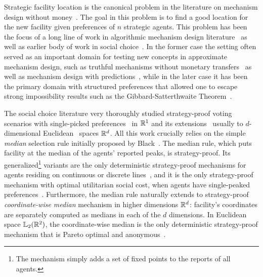 Strategic facility location is the canonical problem in the literature on mechanism design without money~\cite{procaccia2013approximate}. 
The goal in this problem is to find a good location for the new facility given preferences of $n$ strategic agents. 
This problem has been the focus of a long 
line of work in algorithmic mechanism design literature~\cite{procaccia2013approximate, FotakisT14, FotakisT16, SerafinoV16, walsh2020strategy, GkatzelisKST22}  as well as earlier body of work in social choice~\cite{moulin1980strategy,border1983straightforward,kim1984nonmanipulability,peters1993range,barbera1993generalized,ching1997strategy,peremans1997strategy,barbera1998strategy,schummer2002strategy}. In the former case the setting often served as an important domain for testing new concepts in approximate mechanism design, such as truthful mechanisms without monetary transfers~\cite{procaccia2013approximate} as well as mechanism design with predictions~\cite{GkatzelisKST22,XuL22,barak2024mac}, while in the later case it has been the primary domain with structured preferences that allowed one to escape strong impossibility results such as the Gibbard-Satterthwaite Theorem~\cite{Gibbard77,Satterthwaite75}.

%
The social choice literature very thoroughly studied strategy-proof voting scenarios with single-picked preferences~\cite{moulin1980strategy} in $\reals^1$ and its extensions~\cite{barbera1993generalized,barbera1998strategy,schummer2002strategy,ching1997strategy} usually  to $d$-dimensional Euclidean~\cite{kim1984nonmanipulability,peters1993range,border1983straightforward,peremans1997strategy} spaces $\reals^d$.
All this work crucially relies on the simple \emph{median} selection rule initially proposed by Black~\cite{Black48}. The median rule, which puts facility at the median of the agents' reported peaks, is strategy-proof. Its generalized\footnote{The mechanism simply adds a set of fixed points to the reports of all agents.} variants are the only deterministic strategy-proof mechanisms for agents residing on continuous or discrete lines~\cite{DokowFMN12,schummer2002strategy}, and it is the only strategy-proof mechanism with optimal utilitarian social cost, when agents have single-peaked preferences~\cite{moulin1980strategy}. Furthermore, the median rule naturally extends to strategy-proof \emph{coordinate-wise median} mechanism in higher dimensions $\reals^d$: facility's coordinates are separately computed as medians in each of the $d$ dimensions.
In Euclidean space $\lqnorm[2](\reals^2)$, the coordinate-wise median is the only deterministic strategy-proof mechanism that is Pareto optimal and anonymous~\cite{peters1993range}. 

